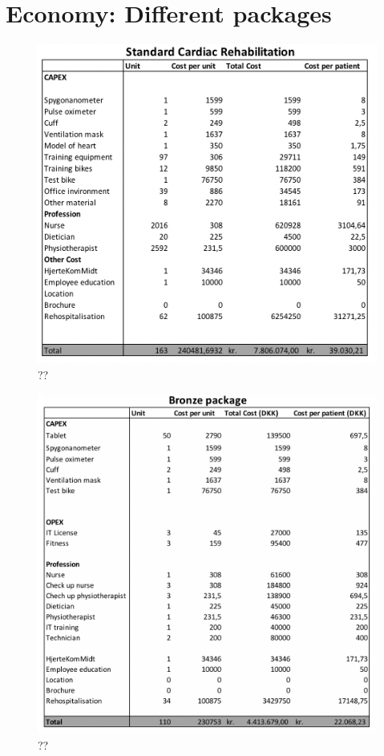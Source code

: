 \chapter{Economy: Different packages} \label{economics}

\begin{figure}[H]
\centering
\includegraphics[width=1\textwidth]{Figure/SCR.png}
\caption{??}
\label{fig: SCR}
\end{figure} 
\begin{figure}[H]
\centering
\includegraphics[width=1\textwidth]{Figure/Bronze.png}
\caption{??}
\label{fig: Bronze}
\end{figure} 


